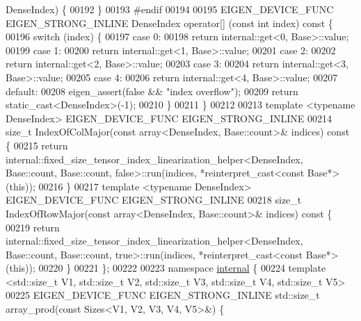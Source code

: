 \begin{DoxyCode}
      DenseIndex) \{
00192   \}
00193 \textcolor{preprocessor}{#endif}
00194 
00195   EIGEN\_DEVICE\_FUNC EIGEN\_STRONG\_INLINE DenseIndex operator[] (\textcolor{keyword}{const} \textcolor{keywordtype}{int} index)\textcolor{keyword}{ const }\{
00196     \textcolor{keywordflow}{switch} (index) \{
00197       \textcolor{keywordflow}{case} 0:
00198         \textcolor{keywordflow}{return} internal::get<0, Base>::value;
00199       \textcolor{keywordflow}{case} 1:
00200         \textcolor{keywordflow}{return} internal::get<1, Base>::value;
00201       \textcolor{keywordflow}{case} 2:
00202         \textcolor{keywordflow}{return} internal::get<2, Base>::value;
00203       \textcolor{keywordflow}{case} 3:
00204         \textcolor{keywordflow}{return} internal::get<3, Base>::value;
00205       \textcolor{keywordflow}{case} 4:
00206         \textcolor{keywordflow}{return} internal::get<4, Base>::value;
00207       \textcolor{keywordflow}{default}:
00208         eigen\_assert(\textcolor{keyword}{false} && \textcolor{stringliteral}{"index overflow"});
00209         \textcolor{keywordflow}{return} \textcolor{keyword}{static\_cast<}DenseIndex\textcolor{keyword}{>}(-1);
00210     \}
00211   \}
00212 
00213   \textcolor{keyword}{template} <\textcolor{keyword}{typename} DenseIndex> EIGEN\_DEVICE\_FUNC EIGEN\_STRONG\_INLINE
00214   \textcolor{keywordtype}{size\_t} IndexOfColMajor(\textcolor{keyword}{const} array<DenseIndex, Base::count>& indices)\textcolor{keyword}{ const }\{
00215     \textcolor{keywordflow}{return} internal::fixed\_size\_tensor\_index\_linearization\_helper<DenseIndex, Base::count, Base::count,
       false>::run(indices, *reinterpret\_cast<const Base*>(\textcolor{keyword}{this}));
00216   \}
00217   \textcolor{keyword}{template} <\textcolor{keyword}{typename} DenseIndex> EIGEN\_DEVICE\_FUNC EIGEN\_STRONG\_INLINE
00218   \textcolor{keywordtype}{size\_t} IndexOfRowMajor(\textcolor{keyword}{const} array<DenseIndex, Base::count>& indices)\textcolor{keyword}{ const }\{
00219     \textcolor{keywordflow}{return} internal::fixed\_size\_tensor\_index\_linearization\_helper<DenseIndex, Base::count, Base::count,
       true>::run(indices, *reinterpret\_cast<const Base*>(\textcolor{keyword}{this}));
00220   \}
00221 \};
00222 
00223 \textcolor{keyword}{namespace }\hyperlink{namespaceinternal}{internal} \{
00224 \textcolor{keyword}{template} <std::\textcolor{keywordtype}{size\_t} V1, std::\textcolor{keywordtype}{size\_t} V2, std::\textcolor{keywordtype}{size\_t} V3, std::\textcolor{keywordtype}{size\_t} V4, std::\textcolor{keywordtype}{size\_t} V5>
00225 EIGEN\_DEVICE\_FUNC EIGEN\_STRONG\_INLINE std::size\_t array\_prod(\textcolor{keyword}{const} Sizes<V1, V2, V3, V4, V5>&) \{

\end{DoxyCode}
